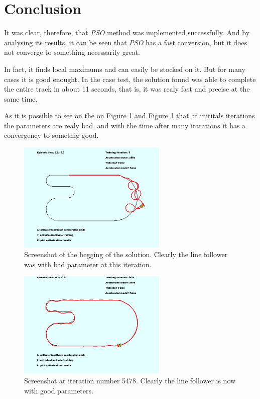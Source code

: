 \section {Conclusion}

It was clear, therefore, that \textit{PSO} method was implemented successfully. And by analysing its results, it can be seen that \textit{PSO} has a fast conversion, but it does not converge to something necessarily great.

In fact, it finds local maximums and can easily be stocked on it. But for many cases it is good enought. In the case test, the solution found was able to complete the entire track in about 11 seconds, that is, it was realy fast and precise at the same time.

As it is possible to see on the on Figure \ref{img:initial_line_follower_solution} and Figure \ref{img:initial_line_follower_solution} that at inititals iterations the parameters are realy bad, and with the time after many itarations it has a convergency to somethig good.

\begin{figure}
  \begin{center}
  \includegraphics[width=2.8in]{./../code/results/initial_line_follower_solution.png}
  \caption{Screenshot of the begging of the solution. Clearly the line follower was with bad parameter at this iteration.}
  \label{img:initial_line_follower_solution}
  \end{center}
\end{figure}

\begin{figure}
  \begin{center}
  \includegraphics[width=2.8in]{./../code/results/line_follower_solution.png}
  \caption{Screenshot at iteration number 5478. Clearly the line follower is now with good parameters.}
  \label{img:line_follower_solution}
  \end{center}
\end{figure}





\vfill

